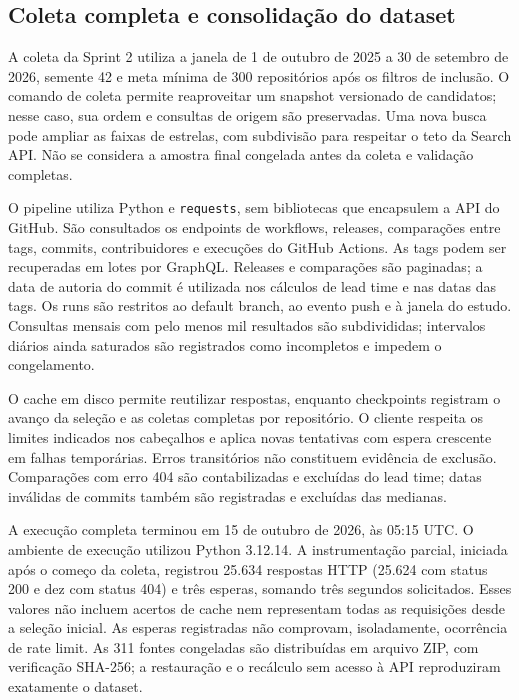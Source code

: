 \subsection{Coleta completa e consolidação do dataset}

A coleta da Sprint 2 utiliza a janela de 1 de outubro de 2025 a 30 de setembro
de 2026, semente 42 e meta mínima de 300 repositórios após os filtros de inclusão.
O comando de coleta permite reaproveitar um snapshot versionado de candidatos;
nesse caso, sua ordem e consultas de origem são preservadas. Uma nova busca pode
ampliar as faixas de estrelas, com subdivisão para respeitar o teto da Search API.
Não se considera a amostra final congelada antes da coleta e validação completas.

O pipeline utiliza Python e \texttt{requests}, sem bibliotecas que encapsulem a
API do GitHub. São consultados os endpoints de workflows, releases, comparações
entre tags, commits, contribuidores e execuções do GitHub Actions. As tags podem
ser recuperadas em lotes por GraphQL. Releases e comparações são paginadas; a
data de autoria do commit é utilizada nos cálculos de lead time e nas datas das
tags. Os runs são restritos ao default branch, ao evento push e à janela do estudo.
Consultas mensais com pelo menos mil resultados são subdivididas; intervalos
diários ainda saturados são registrados como incompletos e impedem o congelamento.

O cache em disco permite reutilizar respostas, enquanto checkpoints registram o
avanço da seleção e as coletas completas por repositório. O cliente respeita os
limites indicados nos cabeçalhos e aplica novas tentativas com espera crescente
em falhas temporárias. Erros transitórios não constituem evidência de exclusão.
Comparações com erro 404 são contabilizadas e excluídas do lead time; datas
inválidas de commits também são registradas e excluídas das medianas.

A execução completa terminou em 15 de outubro de 2026, às 05:15 UTC. O ambiente
de execução utilizou Python 3.12.14. A instrumentação parcial, iniciada após o
começo da coleta, registrou 25.634 respostas HTTP (25.624 com status 200 e dez
com status 404) e três esperas, somando três segundos solicitados. Esses valores
não incluem acertos de cache nem representam todas as requisições desde a seleção
inicial. As esperas registradas não comprovam, isoladamente, ocorrência de rate limit.
As 311 fontes congeladas são distribuídas em arquivo ZIP, com verificação SHA-256;
a restauração e o recálculo sem acesso à API reproduziram exatamente o dataset.

